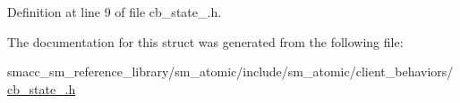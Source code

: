 Definition at line 9 of file cb\+\_\+state\+\_.\+h.



The documentation for this struct was generated from the following file\+:\begin{DoxyCompactItemize}
\item 
smacc\+\_\+sm\+\_\+reference\+\_\+library/sm\+\_\+atomic/include/sm\+\_\+atomic/client\+\_\+behaviors/\hyperlink{cb__state__1_8h}{cb\+\_\+state\+\_.\+h}\end{DoxyCompactItemize}
